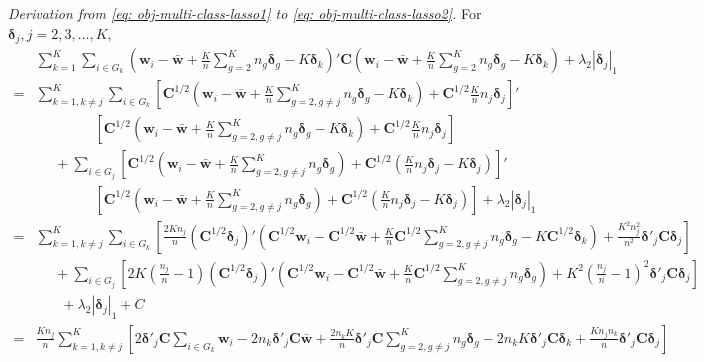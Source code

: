 \documentclass[12pt]{article}
\begin{document}
\noindent \textit{Derivation from \eqref{eq: obj-multi-class-lasso1} to \eqref{eq: obj-multi-class-lasso2}.}
For $\bm \delta_j, j = 2,3,\ldots,K$,
\begin{align}\label{derivation1}
&\sum_{k=1}^{K} \sum_{i \in G_k} (\bm w_i - \bar{\bm w} + \frac{K}{n} \sum_{g=2}^{K} n_g \bm \delta_g - K \bm \delta_k)' \bm C (\bm w_i - \bar{\bm w} + \frac{K}{n} \sum_{g=2}^{K} n_g \bm \delta_g - K \bm \delta_k) + \lambda_2 | \bm \delta_j |_1  \nonumber \\
=& \sum_{k=1, k \neq j}^{K} \sum_{i \in G_k} \left[ \bm C^{1/2} (\bm w_i - \bar{\bm w} + \frac{K}{n} \sum_{g=2, g \neq j}^{K} n_g \bm \delta_g - K \bm \delta_k) + \bm C^{1/2} \frac{K}{n} n_j \bm \delta_j \right]' \nonumber \\
&~~~~~~~~~~~~~~~~~~~\left[ \bm C^{1/2} (\bm w_i - \bar{\bm w} + \frac{K}{n} \sum_{g=2, g \neq j}^{K} n_g \bm \delta_g - K \bm \delta_k) + \bm C^{1/2} \frac{K}{n} n_j \bm \delta_j \right] \nonumber \\
&~~~~~~ + \sum_{i \in G_j} \left[ \bm C^{1/2} (\bm w_i - \bar{\bm w} + \frac{K}{n} \sum_{g=2, g \neq j}^{K} n_g \bm \delta_g) + \bm C^{1/2} (\frac{K}{n} n_j \bm \delta_j  - K \bm \delta_j) \right]'  \nonumber \\
&~~~~~~~~~~~~~~~~~~~\left[ \bm C^{1/2} (\bm w_i - \bar{\bm w} + \frac{K}{n} \sum_{g=2, g \neq j}^{K} n_g \bm \delta_g) + \bm C^{1/2} (\frac{K}{n} n_j \bm \delta_j  - K \bm \delta_j) \right] + \lambda_2 | \bm \delta_j |_1 \nonumber \\
=& \sum_{k=1, k \neq j}^{K} \sum_{i \in G_k} \left[ \frac{2K n_j}{n} (\bm C^{1/2} \bm \delta_j)'(\bm C^{1/2} \bm w_i - \bm C^{1/2} \bar{\bm w} + \frac{K}{n} \bm C^{1/2} \sum_{g=2, g \neq j}^{K} n_g \bm \delta_g - K \bm C^{1/2} \bm \delta_k) + \frac{K^2 n_j^2}{n^2} \bm \delta'_j \bm C \bm \delta_j \right] \nonumber \\
&~~~~~~ + \sum_{i \in G_j} \left[ 2 K (\frac{n_j}{n}-1) (\bm C^{1/2} \bm \delta_j)'(\bm C^{1/2} \bm w_i - \bm C^{1/2} \bar{\bm w} + \frac{K}{n} \bm C^{1/2} \sum_{g=2, g \neq j}^{K} n_g \bm \delta_g) + K^2 (\frac{n_j}{n}-1)^2 \bm \delta'_j \bm C \bm \delta_j  \right]   \nonumber \\
&~~~~~~~~ + \lambda_2 | \bm \delta_j |_1 + C \nonumber \\
=& \frac{K n_j}{n} \sum_{k=1, k \neq j}^{K} \left[ 2 \bm \delta'_j \bm C \sum_{i \in G_k} \bm w_i - 2 n_k \bm \delta'_j \bm C \bar{\bm w} + \frac{2 n_k K}{n} \bm \delta'_j \bm C \sum_{g=2, g \neq j}^{K} n_g \bm \delta_g - 2 n_k K \bm \delta'_j \bm C \bm \delta_k + \frac{K n_j n_k}{n} \bm \delta'_j \bm C \bm \delta_j \right]  \nonumber \\

\end{align}
\end{document}
